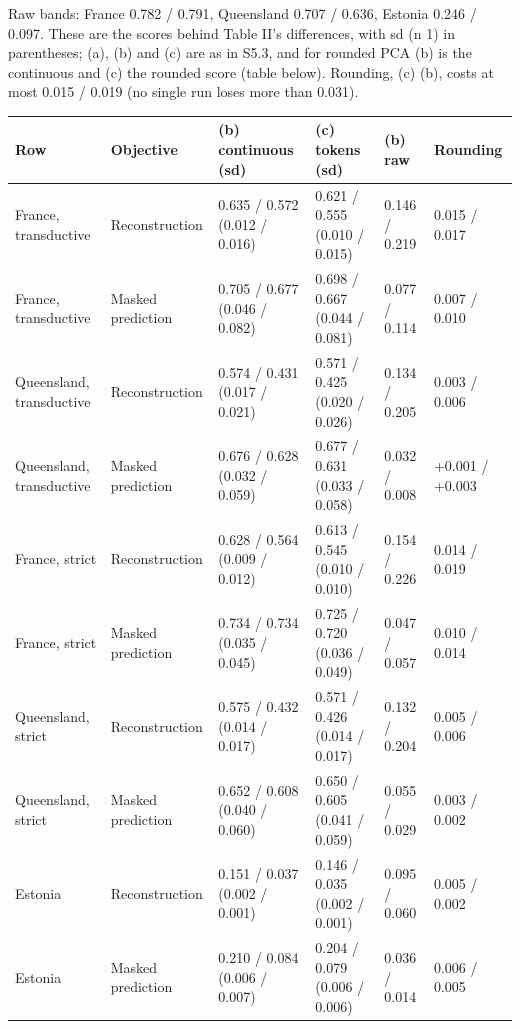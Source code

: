 \documentclass[10pt]{article}
\begin{document}
Raw bands: France 0.782 / 0.791, Queensland 0.707 / 0.636, Estonia 0.246 / 0.097. These are the scores behind Table II's differences, with sd (n \textminus{} 1) in parentheses; (a), (b) and (c) are as in S5.3, and for rounded PCA (b) is the continuous and (c) the rounded score (table below). Rounding, (c) \textminus{} (b), costs at most 0.015 / 0.019 (no single run loses more than 0.031).

{\footnotesize
\begin{xltabular}{\linewidth}{@{}llXXll@{}}
\toprule
Row & Objective & (b) continuous (sd) & (c) tokens (sd) & (b) \textminus{} raw & Rounding \\
\midrule
\endhead
France, transductive & Reconstruction & 0.635 / 0.572 (0.012 / 0.016) & 0.621 / 0.555 (0.010 / 0.015) & \textminus{}0.146 / \textminus{}0.219 & \textminus{}0.015 / \textminus{}0.017 \\
France, transductive & Masked prediction & 0.705 / 0.677 (0.046 / 0.082) & 0.698 / 0.667 (0.044 / 0.081) & \textminus{}0.077 / \textminus{}0.114 & \textminus{}0.007 / \textminus{}0.010 \\
Queensland, transductive & Reconstruction & 0.574 / 0.431 (0.017 / 0.021) & 0.571 / 0.425 (0.020 / 0.026) & \textminus{}0.134 / \textminus{}0.205 & \textminus{}0.003 / \textminus{}0.006 \\
Queensland, transductive & Masked prediction & 0.676 / 0.628 (0.032 / 0.059) & 0.677 / 0.631 (0.033 / 0.058) & \textminus{}0.032 / \textminus{}0.008 & +0.001 / +0.003 \\
France, strict & Reconstruction & 0.628 / 0.564 (0.009 / 0.012) & 0.613 / 0.545 (0.010 / 0.010) & \textminus{}0.154 / \textminus{}0.226 & \textminus{}0.014 / \textminus{}0.019 \\
France, strict & Masked prediction & 0.734 / 0.734 (0.035 / 0.045) & 0.725 / 0.720 (0.036 / 0.049) & \textminus{}0.047 / \textminus{}0.057 & \textminus{}0.010 / \textminus{}0.014 \\
Queensland, strict & Reconstruction & 0.575 / 0.432 (0.014 / 0.017) & 0.571 / 0.426 (0.014 / 0.017) & \textminus{}0.132 / \textminus{}0.204 & \textminus{}0.005 / \textminus{}0.006 \\
Queensland, strict & Masked prediction & 0.652 / 0.608 (0.040 / 0.060) & 0.650 / 0.605 (0.041 / 0.059) & \textminus{}0.055 / \textminus{}0.029 & \textminus{}0.003 / \textminus{}0.002 \\
Estonia & Reconstruction & 0.151 / 0.037 (0.002 / 0.001) & 0.146 / 0.035 (0.002 / 0.001) & \textminus{}0.095 / \textminus{}0.060 & \textminus{}0.005 / \textminus{}0.002 \\
Estonia & Masked prediction & 0.210 / 0.084 (0.006 / 0.007) & 0.204 / 0.079 (0.006 / 0.006) & \textminus{}0.036 / \textminus{}0.014 & \textminus{}0.006 / \textminus{}0.005 \\
\bottomrule
\end{xltabular}}
\end{document}
